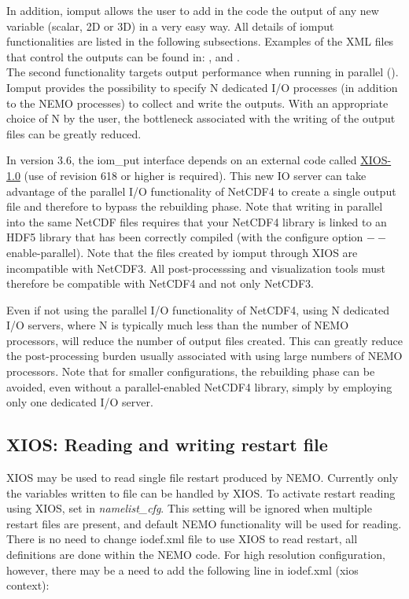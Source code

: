\documentclass[../main/NEMO_manual]{subfiles}
\begin{document}
In addition, iomput allows the user to add in the code the output of any new variable (scalar, 2D or 3D)
in a very easy way.
All details of iomput functionalities are listed in the following subsections.
Examples of the XML files that control the outputs can be found in: ,
 and . \\

The second functionality targets output performance when running in parallel ().
Iomput provides the possibility to specify N dedicated I/O processes (in addition to the NEMO processes)
to collect and write the outputs.
With an appropriate choice of N by the user, the bottleneck associated with the writing of
the output files can be greatly reduced.

In version 3.6, the iom\_put interface depends on
an external code called \href{https://forge.ipsl.jussieu.fr/ioserver/browser/XIOS/branchs/xios-1.0}{XIOS-1.0} 
(use of revision 618 or higher is required).
This new IO server can take advantage of the parallel I/O functionality of NetCDF4 to
create a single output file and therefore to bypass the rebuilding phase.
Note that writing in parallel into the same NetCDF files requires that your NetCDF4 library is linked to
an HDF5 library that has been correctly compiled (\ie with the configure option $--$enable-parallel).
Note that the files created by iomput through XIOS are incompatible with NetCDF3.
All post-processsing and visualization tools must therefore be compatible with NetCDF4 and not only NetCDF3.

Even if not using the parallel I/O functionality of NetCDF4, using N dedicated I/O servers,
where N is typically much less than the number of NEMO processors, will reduce the number of output files created.
This can greatly reduce the post-processing burden usually associated with using large numbers of NEMO processors.
Note that for smaller configurations, the rebuilding phase can be avoided,
even without a parallel-enabled NetCDF4 library, simply by employing only one dedicated I/O server.

\subsection{XIOS: Reading and writing restart file}

XIOS may be used to read single file restart produced by NEMO. Currently only the variables written to 
file  can be handled by XIOS. To activate restart reading using XIOS, set 
in \textit{namelist\_cfg}. This setting will be ignored when multiple restart files are present, and default NEMO 
functionality will be used for reading. There is no need to change iodef.xml file to use XIOS to read 
restart, all definitions are done within the NEMO code. For high resolution configuration, however, 
there may be a need to add the following line in iodef.xml (xios context):
\end{document}
